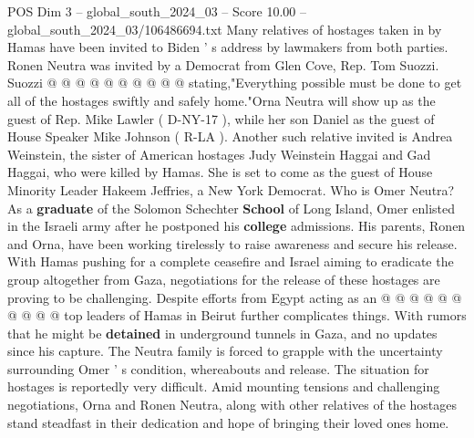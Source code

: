 \begin{textsample}{POS Dim 3 – global\_south\_2024\_03 – Score 10.00 – global\_south\_2024\_03/106486694.txt}
Many relatives of hostages taken in by Hamas have been invited to Biden ' s address by lawmakers from both parties.
Ronen Neutra was invited by a Democrat from Glen Cove, Rep.
Tom Suozzi.
Suozzi @ @ @ @ @ @ @ @ @ @ stating,"Everything possible must be done to get all of the hostages swiftly and safely home."Orna Neutra will show up as the guest of Rep.
Mike Lawler ( D-NY-17 ), while her son Daniel as the guest of House Speaker Mike Johnson ( R-LA ).
Another such relative invited is Andrea Weinstein, the sister of American hostages Judy Weinstein Haggai and Gad Haggai, who were killed by Hamas.
She is set to come as the guest of House Minority Leader Hakeem Jeffries, a New York Democrat.
Who is Omer Neutra?
As a \textbf{graduate} of the Solomon Schechter \textbf{School} of Long Island, Omer enlisted in the Israeli army after he postponed his \textbf{college} admissions.
His parents, Ronen and Orna, have been working tirelessly to raise awareness and secure his release.
With Hamas pushing for a complete ceasefire and Israel aiming to eradicate the group altogether from Gaza, negotiations for the release of these hostages are proving to be challenging.
Despite efforts from Egypt acting as an @ @ @ @ @ @ @ @ @ @ top leaders of Hamas in Beirut further complicates things.
With rumors that he might be \textbf{detained} in underground tunnels in Gaza, and no updates since his capture.
The Neutra family is forced to grapple with the uncertainty surrounding Omer ' s condition, whereabouts and release.
The situation for hostages is reportedly very difficult.
Amid mounting tensions and challenging negotiations, Orna and Ronen Neutra, along with other relatives of the hostages stand steadfast in their dedication and hope of bringing their loved ones home.

\end{textsample}
